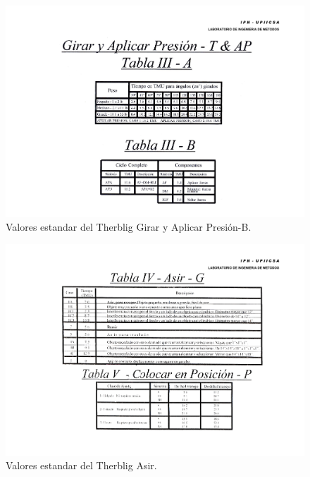 \begin{figure}[H]
    \centering
    \includegraphics[scale=0.6]{15/img/tabla3GirarAplicarPresion-B.pdf}
    \caption{Valores estandar del Therblig Girar y Aplicar Presión-B.}
    \label{fig:tabla3GirarAplicarPresion-B}
\end{figure}

\begin{figure}[H]
    \centering
    \includegraphics[scale=0.4]{15/img/tabla4Asir.pdf}
    \caption{Valores estandar del Therblig Asir.}
    \label{fig:tabla4Asir}
\end{figure}

